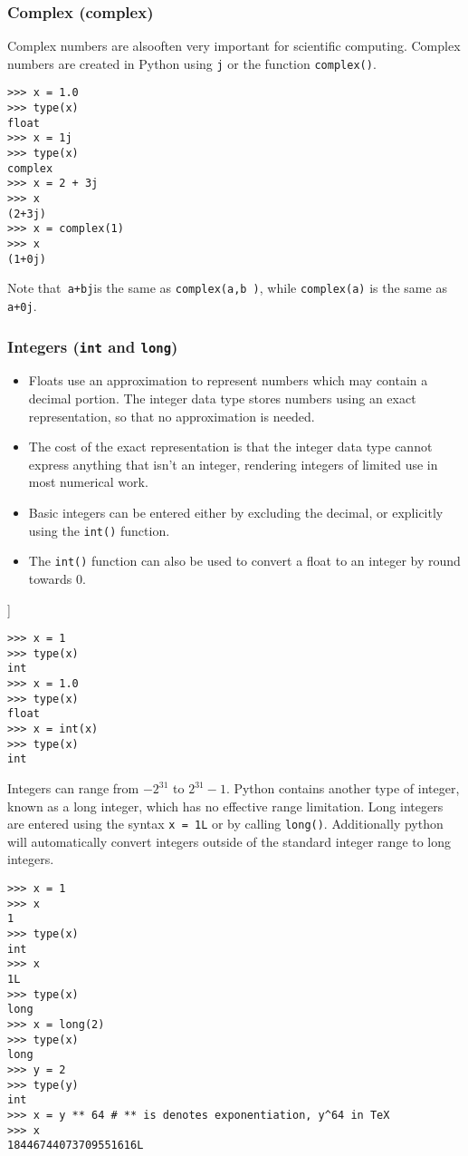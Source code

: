 \documentclass[KSmain.tex]{subfiles}
\begin{document}
\subsubsection{Complex (complex)}

Complex numbers are alsooften very important for scientific computing. Complex numbers are created in Python
using \texttt{j} or the function \texttt{complex()}.
\begin{framed}
\begin{verbatim}
>>> x = 1.0
>>> type(x)
float
>>> x = 1j
>>> type(x)
complex
>>> x = 2 + 3j
>>> x
(2+3j)
>>> x = complex(1)
>>> x
(1+0j)
\end{verbatim}
\end{framed}
\noindent Note that\texttt{ a+bj}is the same as \texttt{complex(a,b )}, while \texttt{complex(a)} is the same as \texttt{a+0j}.


\subsubsection{Integers (\texttt{int} and \texttt{long})}
\begin{itemize}
\item Floats use an approximation to represent numbers which may contain a decimal portion. The integer data
type stores numbers using an exact representation, so that no approximation is needed. \item The cost of the
exact representation is that the integer data type cannot express anything that isn’t an integer, rendering
integers of limited use in most numerical work.
\item Basic integers can be entered either by excluding the decimal, or explicitly using the \texttt{int()}
function. 

\item The \texttt{int()} function can also be used to convert a float to an integer by round towards 0.
\end{itemize}]
\begin{framed}
\begin{verbatim}
>>> x = 1
>>> type(x)
int
>>> x = 1.0
>>> type(x)
float
>>> x = int(x)
>>> type(x)
int
\end{verbatim}
\end{framed}
\noindent Integers can range from $-2^{31}$ to $2^{31}-1$. 
Python contains another type of integer, known as a long
integer, which has no effective range limitation. Long integers are entered using the syntax \texttt{x = 1L} or by
calling \texttt{long()}. Additionally python will automatically convert integers outside of the standard integer
range to long integers.
\begin{framed}
\begin{verbatim}
>>> x = 1
>>> x
1
>>> type(x)
int
>>> x
1L
>>> type(x)
long
>>> x = long(2)
>>> type(x)
long
>>> y = 2
>>> type(y)
int
>>> x = y ** 64 # ** is denotes exponentiation, y^64 in TeX
>>> x
18446744073709551616L
\end{verbatim}
\end{framed}
\newpage
\end{document}
